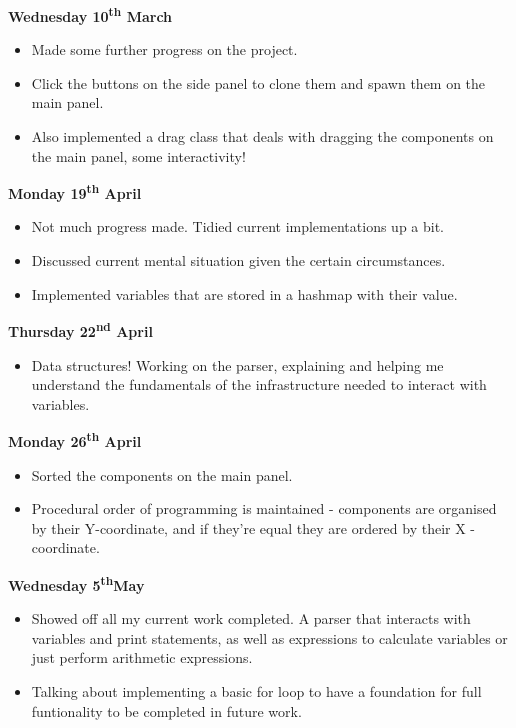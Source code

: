 \documentclass[a4paper, 12pt]{article}
\begin{document}
            \textbf{Wednesday 10\textsuperscript{th} March}
                \begin{itemize}
                    \item Made some further progress on the project.
                    \item Click the buttons on the side panel to clone them and spawn
                    them on the main panel.
                    \item Also implemented a drag class that deals with dragging the components
                    on the main panel, some interactivity! \\
                \end{itemize}
            \textbf{Monday 19\textsuperscript{th} April}
                \begin{itemize}
                    \item Not much progress made. Tidied current implementations up a bit.
                    \item Discussed current mental situation given the certain circumstances.
                    \item Implemented variables that are stored in a hashmap with their value.
                \end{itemize}
            \textbf{Thursday 22\textsuperscript{nd} April}
                \begin{itemize}
                    \item Data structures! Working on the parser, explaining and helping me
                    understand the fundamentals of the infrastructure needed to interact with
                    variables.
                \end{itemize}
            \textbf{Monday 26\textsuperscript{th} April}
                \begin{itemize}
                    \item Sorted the components on the main panel.
                    \item Procedural order of programming is maintained - components are organised
                    by their Y-coordinate, and if they're equal they are ordered by their X
                    -coordinate. \\
                \end{itemize}
            \textbf{Wednesday 5\textsuperscript{th}May}
                \begin{itemize}
                    \item Showed off all my current work completed. A parser that interacts with
                    variables and print statements, as well as expressions to calculate variables
                    or just perform arithmetic expressions.
                    \item Talking about implementing a basic for loop to have a foundation for
                    full funtionality to be completed in future work.
                \end{itemize}
\end{document}
